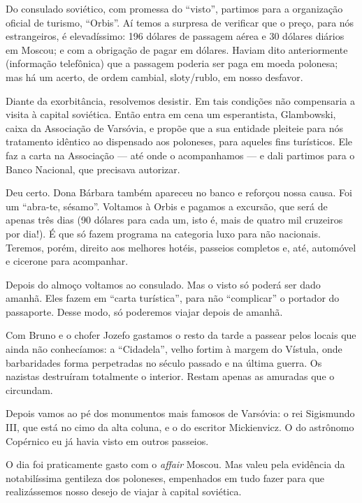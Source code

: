 Do consulado soviético, com promessa do ``visto'', partimos para a organização oficial de turismo, ``Orbis''. Aí temos a surpresa de verificar que o preço, para nós estrangeiros, é elevadíssimo: 196 dólares de passagem aérea e 30 dólares diários em Moscou; e com a obrigação de pagar em dólares. Haviam dito anteriormente (informação telefônica) que a passagem poderia ser paga em moeda polonesa; mas há um acerto, de ordem cambial, sloty/rublo, em nosso desfavor.

Diante da exorbitância, resolvemos desistir. Em tais condições não compensaria a visita à capital soviética. Então entra em cena um esperantista, Glambowski, caixa da Associação de Varsóvia, e propõe que a sua entidade pleiteie para nós tratamento idêntico ao dispensado aos poloneses, para aqueles fins turísticos. Ele faz a carta na Associação --- até onde o acompanhamos --- e dali partimos para o Banco Nacional, que precisava autorizar.

Deu certo. Dona Bárbara também apareceu no banco e reforçou nossa causa. Foi um ``abra-te, sésamo''. Voltamos à Orbis e pagamos a excursão, que será de apenas três dias (90 dólares para cada um, isto é, mais de quatro mil cruzeiros por dia!). É que só fazem programa na categoria luxo para não nacionais. Teremos, porém, direito aos melhores hotéis, passeios completos e, até, automóvel e cicerone para acompanhar.

Depois do almoço voltamos ao consulado. Mas o visto só poderá ser dado amanhã. Eles fazem em ``carta turística'', para não ``complicar'' o portador do passaporte. Desse modo, só poderemos viajar depois de amanhã.

Com Bruno e o chofer Jozefo gastamos o resto da tarde a passear pelos locais que ainda não conhecíamos: a ``Cidadela'', velho fortim à margem do Vístula, onde barbaridades forma perpetradas no século passado e na última guerra. Os nazistas destruíram totalmente o interior. Restam apenas as amuradas que o circundam.

Depois vamos ao pé dos monumentos mais famosos de Varsóvia: o rei Sigismundo III, que está no cimo da alta coluna, e o do escritor Mickienvicz. O do astrônomo Copérnico eu já havia visto em outros passeios.

O dia foi praticamente gasto com o \textit{affair} Moscou. Mas valeu pela evidência da notabilíssima gentileza dos poloneses, empenhados em tudo fazer para que realizássemos nosso desejo de viajar à capital soviética.

